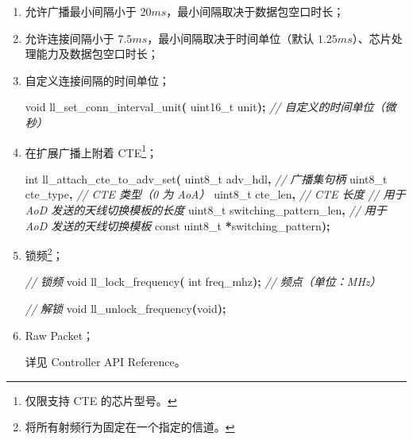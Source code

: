 \documentclass[
  12pt,
]{book}
\newenvironment{Shaded}{\begin{snugshade}}{\end{snugshade}}
\newcommand{\CommentTok}[1]{\textcolor[rgb]{0.56,0.35,0.01}{\textit{#1}}}
\newcommand{\DataTypeTok}[1]{\textcolor[rgb]{0.13,0.29,0.53}{#1}}
\newcommand{\NormalTok}[1]{#1}
\newcommand{\OperatorTok}[1]{\textcolor[rgb]{0.81,0.36,0.00}{\textbf{#1}}}
\begin{document}
\begin{enumerate}
\def\labelenumi{\arabic{enumi}.}
\item
  允许广播最小间隔小于 \(20ms\)，最小间隔取决于数据包空口时长；
\item
  允许连接间隔小于 \(7.5ms\)，最小间隔取决于时间单位（默认 \(1.25ms\)）、芯片处理能力及数据包空口时长；
\item
  自定义连接间隔的时间单位；

\begin{Shaded}
\begin{Highlighting}[]
\DataTypeTok{void}\NormalTok{ ll\_set\_conn\_interval\_unit}\OperatorTok{(}
  \DataTypeTok{uint16\_t}\NormalTok{ unit}\OperatorTok{);}   \CommentTok{// 自定义的时间单位（微秒）}
\end{Highlighting}
\end{Shaded}
\item
  在扩展广播上附着 CTE\footnote{仅限支持 CTE 的芯片型号。}；

\begin{Shaded}
\begin{Highlighting}[]
\DataTypeTok{int}\NormalTok{ ll\_attach\_cte\_to\_adv\_set}\OperatorTok{(}
  \DataTypeTok{uint8\_t}\NormalTok{ adv\_hdl}\OperatorTok{,}  \CommentTok{// 广播集句柄}
  \DataTypeTok{uint8\_t}\NormalTok{ cte\_type}\OperatorTok{,} \CommentTok{// CTE 类型（0 为 AoA）}
  \DataTypeTok{uint8\_t}\NormalTok{ cte\_len}\OperatorTok{,}  \CommentTok{// CTE 长度}
  \CommentTok{// 用于 AoD 发送的天线切换模板的长度}
  \DataTypeTok{uint8\_t}\NormalTok{ switching\_pattern\_len}\OperatorTok{,}
  \CommentTok{// 用于 AoD 发送的天线切换模板}
  \DataTypeTok{const} \DataTypeTok{uint8\_t} \OperatorTok{*}\NormalTok{switching\_pattern}\OperatorTok{);}
\end{Highlighting}
\end{Shaded}
\item
  锁频\footnote{将所有射频行为固定在一个指定的信道。}；

\begin{Shaded}
\begin{Highlighting}[]
\CommentTok{// 锁频}
\DataTypeTok{void}\NormalTok{ ll\_lock\_frequency}\OperatorTok{(}
  \DataTypeTok{int}\NormalTok{ freq\_mhz}\OperatorTok{);}    \CommentTok{// 频点（单位：MHz）}

\CommentTok{// 解锁}
\DataTypeTok{void}\NormalTok{ ll\_unlock\_frequency}\OperatorTok{(}\DataTypeTok{void}\OperatorTok{);}
\end{Highlighting}
\end{Shaded}
\item
  Raw Packet；

  详见 Controller API Reference。
\end{enumerate}
\end{document}
